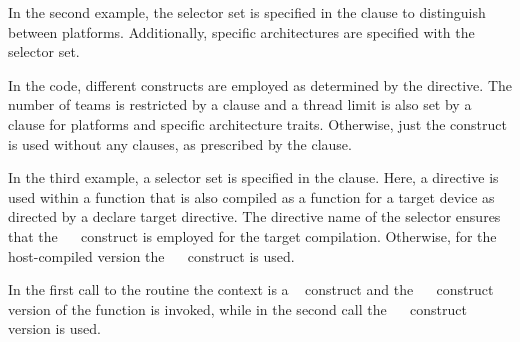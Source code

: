 
{}
In the second example, the  selector set is specified
in the  clause to distinguish between platforms. 
Additionally, specific architectures are specified with the  
selector set.

In the code, different  constructs are employed as determined
by the  directive.
The number of teams is restricted by a  clause
and a thread limit is also set by a  clause for 
 platforms and specific architecture
traits.  Otherwise, just the  construct is used without
any clauses, as prescribed by the  clause.



\clearpage




In the third example, a  selector set is specified in the  clause.  
Here, a  directive is used within a function that is also
compiled as a function for a target device as directed by a declare target directive.
The  directive name of the  selector ensures that the
~~ construct is employed for the target compilation.
Otherwise, for the host-compiled version the ~~ construct is used.

In the first call to the  routine the context is a
~ construct and the ~~
construct version of the function is invoked,
while in the second call the ~~ construct version is used.

